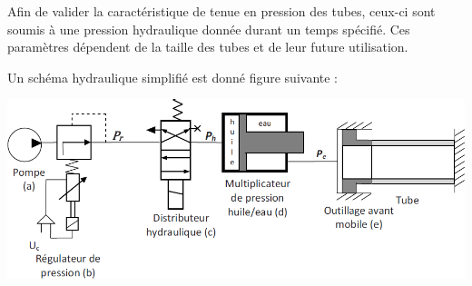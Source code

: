 \documentclass[10pt,fleqn]{article} %
\begin{document}
\begin{multicols}{2}
Afin de valider la caractéristique de tenue en pression des tubes, ceux-ci sont soumis à une pression hydraulique donnée durant un temps spécifié. Ces paramètres dépendent de la taille des tubes et de leur future utilisation.

%
%
Un schéma hydraulique simplifié est donné figure suivante :
\begin{center}
\includegraphics[width=\linewidth]{images/fig_01}
\end{center}
%
%

\end{multicols}
\end{document}
